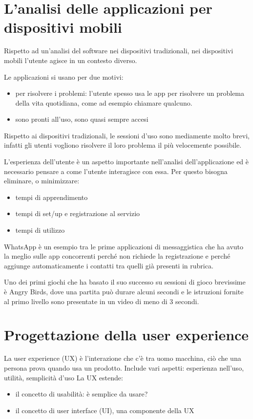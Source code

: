 \section{L'analisi delle applicazioni per dispositivi mobili}
Rispetto ad un'analisi del software nei dispositivi tradizionali, nei dispositivi mobili l'utente agisce in un contesto diverso.

Le applicazioni si usano per due motivi:
\begin{itemize}
    \item per risolvere i problemi: l’utente spesso usa le app per risolvere un problema della vita quotidiana, come ad esempio chiamare qualcuno. 
    \item sono pronti all'uso, sono quasi sempre accesi
\end{itemize}

Rispetto ai dispositivi tradizionali, le sessioni d’uso sono mediamente molto brevi, infatti gli utenti vogliono risolvere il loro problema il più velocemente possibile.

L'esperienza dell'utente è un aspetto importante nell'analisi dell'applicazione ed è necessario pensare a come l'utente interagisce con essa. Per questo bisogna eliminare, o minimizzare:
\begin{itemize}
    \item tempi di apprendimento
    \item tempi di set/up e registrazione al servizio
    \item tempi di utilizzo
\end{itemize}

WhatsApp è un esempio tra le prime applicazioni di messaggistica che ha avuto la meglio sulle app concorrenti perché non richiede la registrazione e perché aggiunge automaticamente i contatti tra quelli già presenti in rubrica. 

Uno dei primi giochi che ha basato il suo successo su sessioni di gioco brevissime è Angry Birds, dove una partita può durare alcuni secondi e le istruzioni fornite al primo livello sono presentate in un video di meno di 3 secondi.

\section{Progettazione della user experience}
La user experience (UX) è l'interazione che c'è tra uomo macchina, ciò che una persona prova quando usa un prodotto. 
Include vari aspetti: esperienza nell’uso, utilità, semplicità d’uso
La UX estende:
\begin{itemize}
    \item il concetto di usabilità: è semplice da usare?
    \item il concetto di user interface (UI), una componente della UX
\end{itemize}

